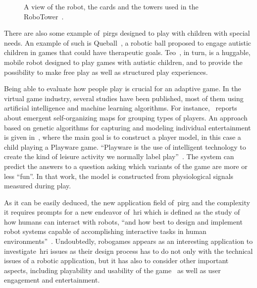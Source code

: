 \begin{figure}[htp]
  \centering  
  \caption{A view of the robot, the cards and the towers used in the RoboTower~\citep{bonarini_timing_2014}.}
    \label{fig:robo_tower}
\end{figure}

There are also some example of~\gls{pirg}s designed to play with children with special needs. An example of such is Queball~\citep{salter_designing_2014}, a robotic ball proposed to engage autistic children in games that could have therapeutic goals. Teo~\citep{bonarini_huggable_2016}, in turn, is a huggable, mobile robot designed to play games with autistic children, and to provide the possibility to make free play as well as structured play experiences.

Being able to evaluate how people play is crucial for an adaptive game. In the virtual game industry, several studies have been published, most of them using artificial intelligence and machine learning algorithms. For instance,~\cite{drachen_player_2009} reports about emergent self-organizing maps for grouping types of players. An approach based on genetic algorithms for capturing and modeling individual entertainment is given in~\cite{yannakakis_entertainment_2008}, where the main goal is to construct a player model, in this case a child playing a Playware game. ``Playware is the use of intelligent technology to create the kind of leisure activity we normally label play''~\citep{lund_playware_2005}. The system can predict the answers to a question asking which variants of the game are more or less ``fun''. In that work, the model is constructed from physiological signals measured during play. 

As it can be easily deduced, the new application field of~\gls{pirg} and the complexity it requires prompts for a new endeavor of~\gls{hri} which is defined as the study of how humans can interact with robots, ``and how best to design and implement robot systems capable of accomplishing interactive tasks in human environments''~\citep{feil-seifer_human_2009}. Undoubtedly, robogames appears as an interesting application to investigate~\gls{hri} issues as their design process has to do not only with the technical issues of a robotic application, but it has also to consider other important aspects, including playability and usability of the game~\citep{martinoia_physically_2013} as well as user engagement and entertainment.

